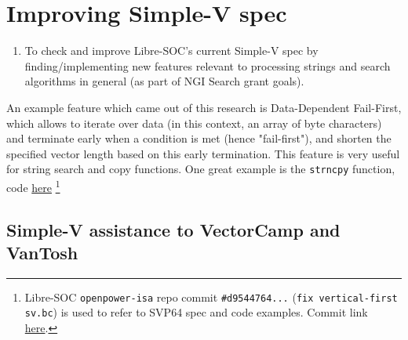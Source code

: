 %

\chapter{Improving Simple-V spec}

\begin{enumerate}
  \item To check and improve Libre-SOC's current Simple-V spec by finding/implementing
  new features relevant to processing strings and search algorithms in general
  (as part of \acrshort{NGI} Search grant goals).
\end{enumerate}

An example feature which came out of this research is
Data-Dependent Fail-First, which allows to iterate over data (in
this context, an array of byte characters) and terminate early when
a condition is met (hence "fail-first"), and shorten the specified
vector length based on this early termination. This feature is very useful
for string search and copy functions.
One great example is the \texttt{strncpy} function,
code \href{https://git.libre-soc.org/?p=openpower-isa.git;a=blob;f=src/openpower/decoder/isa/test_caller_svp64_ldst.py;h=4ecf534777a5e8a0178b29dbcd69a1a5e2dd14d6;hb=d9544764b1710f3807a9c0685d150a665f70b9a2#l31}{here}
\footnote{Libre-SOC \texttt{openpower-isa} repo commit \texttt{\#d9544764...}
(\texttt{fix vertical-first sv.bc}) is used to refer to
\acrshort{SVP64} spec and code examples. Commit link
\href{https://git.libre-soc.org/?p=openpower-isa.git;a=commit;h=d9544764b1710f3807a9c0685d150a665f70b9a2}{here}.}

\section{Simple-V assistance to VectorCamp and VanTosh}

